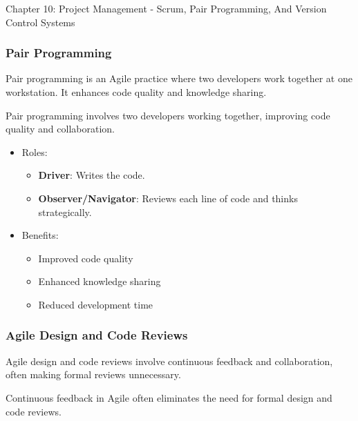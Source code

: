 \begin{notes}{Chapter 10: Project Management - Scrum, Pair Programming, And Version Control Systems}
\begin{highlight}
    \end{highlight}
    
    \subsubsection*{Pair Programming}
    
    Pair programming is an Agile practice where two developers work together at one workstation. It enhances code quality and knowledge sharing.
    
    \begin{highlight}
    
        Pair programming involves two developers working together, improving code quality and collaboration.
        
        \begin{itemize}
            \item Roles:
            \begin{itemize}
                \item \textbf{Driver}: Writes the code.
                \item \textbf{Observer/Navigator}: Reviews each line of code and thinks strategically.
            \end{itemize}
            \item Benefits:
            \begin{itemize}
                \item Improved code quality
                \item Enhanced knowledge sharing
                \item Reduced development time
            \end{itemize}
        \end{itemize}
    
    \end{highlight}
    
    \subsubsection*{Agile Design and Code Reviews}
    
    Agile design and code reviews involve continuous feedback and collaboration, often making formal reviews unnecessary.
    
    \begin{highlight}
    
        Continuous feedback in Agile often eliminates the need for formal design and code reviews.
        

\end{highlight}
\end{notes}
